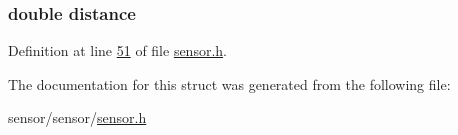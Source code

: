 \subsubsection[{\texorpdfstring{distance}{distance}}]{\setlength{\rightskip}{0pt plus 5cm}double distance}\hypertarget{struct_a_d_c__distance__pair_a79b8e036dca6911e3295a47d99f21f43}{}\label{struct_a_d_c__distance__pair_a79b8e036dca6911e3295a47d99f21f43}


Definition at line \hyperlink{sensor_8h_source_l00051}{51} of file \hyperlink{sensor_8h_source}{sensor.\+h}.



The documentation for this struct was generated from the following file\+:\begin{DoxyCompactItemize}
\item 
sensor/sensor/\hyperlink{sensor_8h}{sensor.\+h}\end{DoxyCompactItemize}

